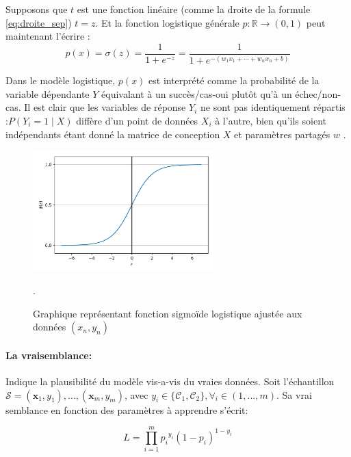 	Supposons que $t$ est une fonction linéaire (comme la droite de la formule \ref{eq:droite_sep}) $t = z$. Et la fonction logistique générale ${ p:\mathbb {R} \rightarrow (0,1)}$ peut maintenant l'écrire :
	\begin{equation}\label{eq:sigmoid-dev}
	{\displaystyle p(x)=\sigma (z)= {\frac {1}{1+e^{-z}}} ={\frac {1}{1+e^{-(w _{1}x_{1}+\cdots +w_{n}x_{n}+b)}}}}
	\end{equation} 
	
	
	
	Dans le modèle logistique, $p(x)$ est interprété comme la probabilité de la variable dépendante ${Y}$ équivalant à un succès/cas-oui plutôt qu'à un échec/non-cas. Il est clair que les variables de réponse $Y_{i}$ ne sont pas identiquement répartis :$P(Y_{i}=1\mid X)$ diffère d'un point de données $X_{i}$ à l'autre, bien qu'ils soient indépendants étant donné la matrice de conception $X$ et paramètres partagés $w$ \cite{antoine2018apprentissage}. 
	
	
	\begin{figure}[H]%
		\centering
		\includegraphics[width=7cm]{images/reg_log_curve.png}
		\caption[Graphique représentant fonction logistique.]{Graphique représentant fonction sigmoïde logistique ajustée aux données $(x_n , y_n)$ \cite{ml2008python}}.
		\label{fig:reg_log_sigmoid}
	\end{figure}
	
	\paragraph*{La vraisemblance:}Indique la plausibilité du  modèle vis-a-vis du vraies données.
	Soit l'échantillon $ \mathcal{S} = {(\mathbf{x}_1, y_1),..., (\mathbf{x}_m, y_m)}$, avec $y_i \in \{\mathcal{C}_1,\mathcal{C}_2\}, \forall_i \in (1,...,m)$. Sa vrai semblance en fonction des paramètres à apprendre s'écrit:
	
	\begin{equation}\label{eq:likelyhood}
	L = \prod_{i=1}^{m} {p_i}^{y_i} (1-p_i)^{1-y_i}
	\end{equation}
	
